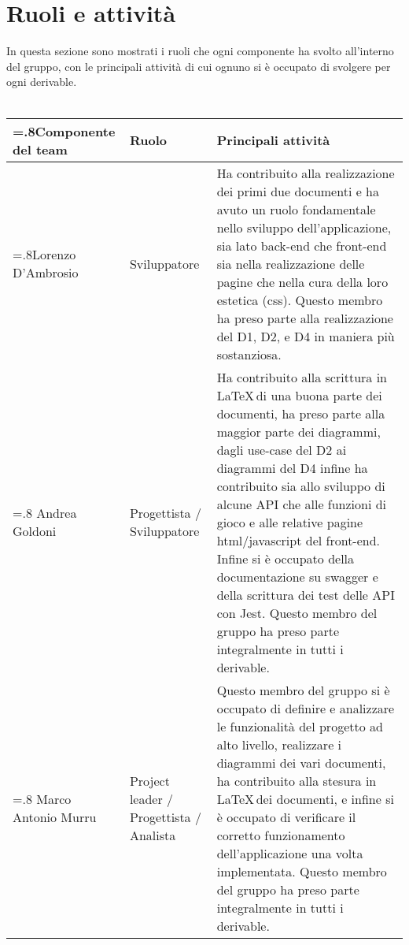 \section{Ruoli e attività}
In questa sezione sono mostrati i ruoli che ogni componente ha svolto all'interno del gruppo, con le principali attività di cui ognuno si è occupato di svolgere per ogni derivable.
\\
\\
\begin{tabularx}{\linewidth}{
    |>{\hsize=.8\hsize}X|%
    >{\hsize=0.8\hsize}X|%
    >{\hsize=1.4\hsize}X|%
  }
    \hline
    \textbf{Componente del team} & \textbf{Ruolo} & \textbf{Principali attività} \\
    \hline
    Lorenzo D'Ambrosio & Sviluppatore & Ha contribuito alla realizzazione dei primi due documenti e ha avuto un ruolo fondamentale nello sviluppo dell'applicazione, sia lato back-end che front-end sia nella realizzazione delle pagine che nella cura della loro estetica (css). Questo membro ha preso parte alla realizzazione del D1, D2, e D4 in maniera più sostanziosa. \\
    \hline
    Andrea Goldoni & Progettista / Sviluppatore & Ha contribuito alla scrittura in \LaTeX \,di una buona parte dei documenti, ha preso parte alla maggior parte dei diagrammi, dagli use-case del D2 ai diagrammi del D4 infine ha contribuito sia allo sviluppo di alcune API che alle funzioni di gioco e alle relative pagine html/javascript del front-end. Infine si è occupato della documentazione su swagger e della scrittura dei test delle API con Jest. Questo membro del gruppo ha preso parte integralmente in tutti i derivable. \\
    \hline
    Marco Antonio Murru & Project leader / Progettista / Analista & Questo membro del gruppo si è occupato di definire e analizzare le funzionalità del progetto ad alto livello, realizzare i diagrammi dei vari documenti, ha contribuito alla stesura in \LaTeX \,dei documenti, e infine si è occupato di verificare il corretto funzionamento dell'applicazione una volta implementata. Questo membro del gruppo ha preso parte integralmente in tutti i derivable. \\
    \hline
\end{tabularx}

